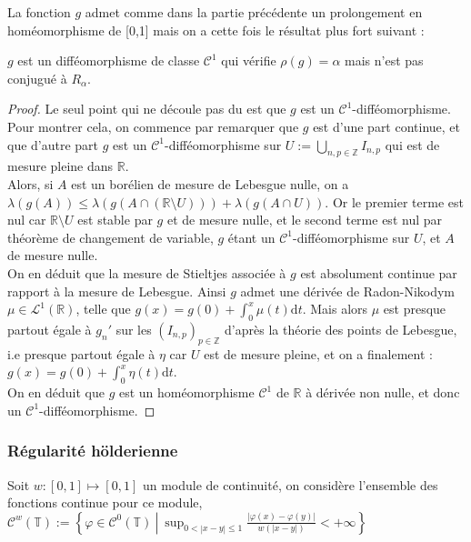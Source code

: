 \documentclass[11pt,a4paper]{article}
\begin{document}
La fonction $g$ admet comme dans la partie précédente un prolongement en homéomorphisme de [0,1] mais on a cette fois le résultat plus fort suivant :

\begin{thm}
$g$ est un difféomorphisme de classe $\mathcal{C}^1$ qui vérifie $\rho(g)=\alpha$ mais n'est pas conjugué à $R_\alpha$.
\end{thm}


\begin{proof}
Le seul point qui ne découle pas du  est que $g$ est un $\mathcal{C}^1$-difféomorphisme. Pour montrer cela, on commence par remarquer que $g$ est d'une part continue, et que d'autre part $g$ est un $\mathcal{C}^1$-difféomorphisme sur $\displaystyle U := \bigcup_{n,p\in \mathbb{Z}} I_{n,p}$ qui est de mesure pleine dans $\mathbb{R}$. \\
Alors, si $A$ est un borélien de mesure de Lebesgue nulle, on a $\lambda(g(A)) \leq \lambda(g(A\cap (\mathbb{R} \setminus U))) + \lambda(g(A\cap U))$. 
Or le premier terme est nul car $\mathbb{R} \setminus U$ est stable par $g$ et de mesure nulle, et le second terme est nul par théorème de changement de variable, $g$ étant un $\mathcal{C}^1$-difféomorphisme sur $ U $, et $A$ de mesure nulle. \\

On en déduit que la mesure de Stieltjes associée à $g$ est absolument continue par rapport à la mesure de Lebesgue. Ainsi $g$ admet une dérivée de Radon-Nikodym $\mu \in \mathcal{L}^1(\mathbb{R})$, telle que $g(x) = g(0) + \displaystyle \int_0^x \mu(t) \mathrm{d}t$. Mais alors $\mu$ est presque partout égale à $g_n'$ sur les $(I_{n,p})_{p\in \mathbb{Z}}$ d'après la théorie des points de Lebesgue, i.e presque partout égale à $\eta$ car $U$ est de mesure pleine, et on a finalement : $g(x) = g(0) + \displaystyle \int_0^x \eta(t) \mathrm{d}t$. \\
On en déduit que $g$ est un homéomorphisme $\mathcal{C}^1$ de $\mathbb{R}$ à dérivée non nulle, et donc un $\mathcal{C}^1$-difféomorphisme. 
\end{proof}

\subsubsection{Régularité hölderienne}

Soit $w:[0, 1] \mapsto [0, 1]$ un module de continuité, on considère l'ensemble des fonctions continue pour ce module, $\displaystyle\mathcal{C}^w(\mathbb{T}) := \left\{ \varphi \in \mathcal{C}^0(\mathbb{T}) \ \left| \ \sup_{ 0<|x-y|\leq 1}  \frac{|\varphi(x)-\varphi(y)|}{w(|x-y|)} < +\infty \right. \right\} $ \\
\end{document}
